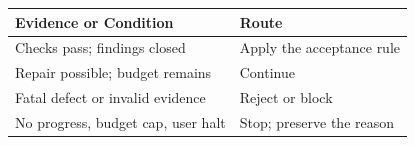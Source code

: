 \begin{tabular}{@{}P{4.0cm}P{8.5cm}@{}}
\toprule
\textbf{Evidence or Condition} & \textbf{Route} \\
\midrule
Checks pass; findings closed & Apply the acceptance rule \\
Repair possible; budget remains & Continue \\
Fatal defect or invalid evidence & Reject or block \\
No progress, budget cap, user halt & Stop; preserve the reason \\
\bottomrule
\end{tabular}
